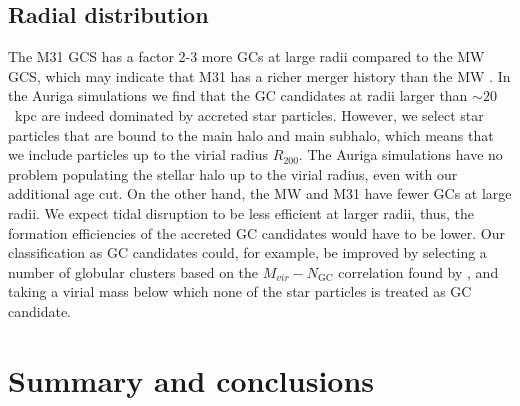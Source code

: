 \documentclass[a4paper,fleqn,usenatbib]{mnras}
\newcommand{\Sun}[0]{\ensuremath{_{\odot}}}
\providecommand{\DIFadd}[1]{{\protect\color{blue}\uwave{#1}}} %
\providecommand{\DIFdel}[1]{{\protect\color{red}\sout{#1}}}                      %
\providecommand{\DIFaddbegin}{} %
\providecommand{\DIFaddend}{} %
\providecommand{\DIFdelbegin}{} %
\providecommand{\DIFdelend}{} %
\newcommand{\DIFscaledelfig}{0.5}
\newlength{\DIFdelgraphicswidth} %
\newlength{\DIFdelgraphicsheight} %
\newcommand{\DIFaddincludegraphics}[2][]{{\color{blue}\fbox{\DIFOincludegraphics[#1]{#2}}}} %
\newcommand{\DIFdelincludegraphics}[2][]{%
\sbox{\DIFdelgraphicsbox}{\DIFOincludegraphics[#1]{#2}}%
\settoboxwidth{\DIFdelgraphicswidth}{\DIFdelgraphicsbox} %
\settoboxtotalheight{\DIFdelgraphicsheight}{\DIFdelgraphicsbox} %
\scalebox{\DIFscaledelfig}{%
\parbox[b]{\DIFdelgraphicswidth}{\usebox{\DIFdelgraphicsbox}\\[-\baselineskip] \rule{\DIFdelgraphicswidth}{0em}}\llap{\resizebox{\DIFdelgraphicswidth}{\DIFdelgraphicsheight}{%
\setlength{\unitlength}{\DIFdelgraphicswidth}%
\begin{picture}(1,1)%
\thicklines\linethickness{2pt} %
{\color[rgb]{1,0,0}\put(0,0){\framebox(1,1){}}}%
{\color[rgb]{1,0,0}\put(0,0){\line( 1,1){1}}}%
{\color[rgb]{1,0,0}\put(0,1){\line(1,-1){1}}}%
\end{picture}%
}\hspace*{3pt}}} %
} %
\DeclareRobustCommand{\DIFaddbegin}{\DIFOaddbegin \let\includegraphics\DIFaddincludegraphics} %
\DeclareRobustCommand{\DIFaddend}{\DIFOaddend \let\includegraphics\DIFOincludegraphics} %
\DeclareRobustCommand{\DIFdelbegin}{\DIFOdelbegin \let\includegraphics\DIFdelincludegraphics} %
\DeclareRobustCommand{\DIFdelend}{\DIFOaddend \let\includegraphics\DIFOincludegraphics} %
\begin{document}
\subsection{Radial distribution}
\label{sec:discussion_Rgc}
The M31 GCS has a factor 2-3 more GCs at large radii compared to the MW GCS,
which may indicate that M31 has a richer merger history than the MW 
\citep{2016ApJ...824...42C}. In the Auriga simulations we find that the GC 
candidates at radii larger than ${\sim}20$~kpc are indeed dominated by accreted
star particles. However, we select star particles that are bound to the main 
halo and main subhalo, which means that we include particles up to the virial 
radius $R_{200}$. The Auriga simulations have no problem populating the stellar 
halo up to the virial radius, even with our additional age cut. On the other hand, 
the MW and M31 have fewer GCs at large radii. We expect tidal disruption to be
less efficient at larger radii, thus, the formation efficiencies of the accreted 
GC candidates would have to be lower. Our classification as GC candidates could, 
for example, be improved by selecting a number of globular clusters based on the 
\DIFdelbegin \DIFdel{$M_{vir}-N_{\text{GC}}$ }\DIFdelend \DIFaddbegin \DIFadd{$M_{vir}-N_{\text{gal}}$ }\DIFaddend correlation found by \citet{2019arXiv190100900B}, and 
taking a virial mass below which none of the star particles is treated as GC candidate.




\section{Summary and conclusions}
\label{sec:conclusions}
\end{document}
